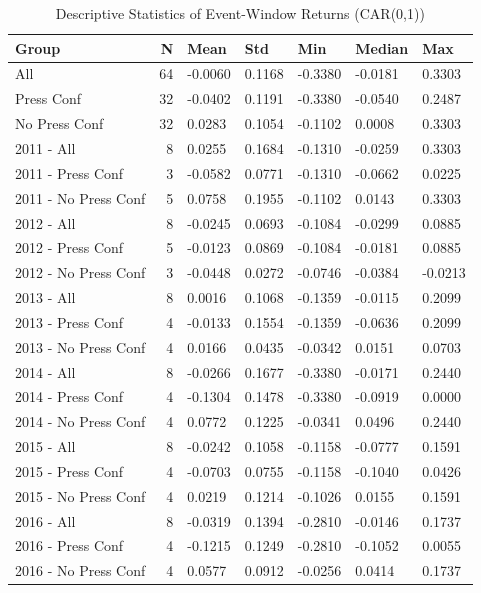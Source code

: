 \begin{table}
\caption{Descriptive Statistics of Event-Window Returns (CAR(0,1))}
\label{tab:desc_stats}
\begin{tabular}{lrlllll}
\toprule
Group & N & Mean & Std & Min & Median & Max \\
\midrule
All & 64 & -0.0060 & 0.1168 & -0.3380 & -0.0181 & 0.3303 \\
Press Conf & 32 & -0.0402 & 0.1191 & -0.3380 & -0.0540 & 0.2487 \\
No Press Conf & 32 & 0.0283 & 0.1054 & -0.1102 & 0.0008 & 0.3303 \\
  2011 - All & 8 & 0.0255 & 0.1684 & -0.1310 & -0.0259 & 0.3303 \\
  2011 - Press Conf & 3 & -0.0582 & 0.0771 & -0.1310 & -0.0662 & 0.0225 \\
  2011 - No Press Conf & 5 & 0.0758 & 0.1955 & -0.1102 & 0.0143 & 0.3303 \\
  2012 - All & 8 & -0.0245 & 0.0693 & -0.1084 & -0.0299 & 0.0885 \\
  2012 - Press Conf & 5 & -0.0123 & 0.0869 & -0.1084 & -0.0181 & 0.0885 \\
  2012 - No Press Conf & 3 & -0.0448 & 0.0272 & -0.0746 & -0.0384 & -0.0213 \\
  2013 - All & 8 & 0.0016 & 0.1068 & -0.1359 & -0.0115 & 0.2099 \\
  2013 - Press Conf & 4 & -0.0133 & 0.1554 & -0.1359 & -0.0636 & 0.2099 \\
  2013 - No Press Conf & 4 & 0.0166 & 0.0435 & -0.0342 & 0.0151 & 0.0703 \\
  2014 - All & 8 & -0.0266 & 0.1677 & -0.3380 & -0.0171 & 0.2440 \\
  2014 - Press Conf & 4 & -0.1304 & 0.1478 & -0.3380 & -0.0919 & 0.0000 \\
  2014 - No Press Conf & 4 & 0.0772 & 0.1225 & -0.0341 & 0.0496 & 0.2440 \\
  2015 - All & 8 & -0.0242 & 0.1058 & -0.1158 & -0.0777 & 0.1591 \\
  2015 - Press Conf & 4 & -0.0703 & 0.0755 & -0.1158 & -0.1040 & 0.0426 \\
  2015 - No Press Conf & 4 & 0.0219 & 0.1214 & -0.1026 & 0.0155 & 0.1591 \\
  2016 - All & 8 & -0.0319 & 0.1394 & -0.2810 & -0.0146 & 0.1737 \\
  2016 - Press Conf & 4 & -0.1215 & 0.1249 & -0.2810 & -0.1052 & 0.0055 \\
  2016 - No Press Conf & 4 & 0.0577 & 0.0912 & -0.0256 & 0.0414 & 0.1737 \\

\end{tabular}
\end{table}
